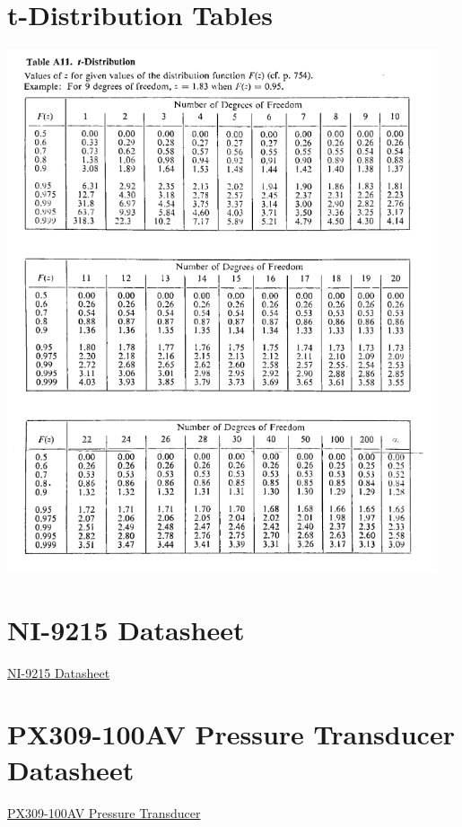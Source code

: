 \documentclass{article}
\begin{document}
\newpage
\begin{appendices}
\pagestyle{fancy}
\renewcommand{\thefigure}{A\arabic{figure}}
\setcounter{figure}{0}

\section*{t-Distribution Tables}
\hypertarget{1}{\includegraphics[width=0.95\textwidth]{t_distribution_Table_lecture3.png}}

\section*{NI-9215 Datasheet}
\href{https://www.amc-systeme.de/files/pdf/ni-9215-amc.pdf}{NI-9215 Datasheet}

\section*{PX309-100AV Pressure Transducer Datasheet}
\href{https://www.farnell.com/datasheets/2339490.pdf}{PX309-100AV Pressure Transducer}
\end{appendices}
\end{document}
